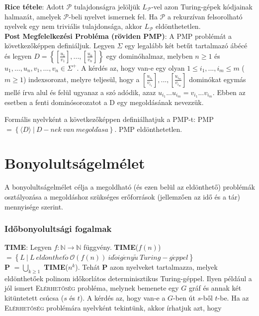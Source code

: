 \documentclass[margin=0px]{article}
\begin{document}
\noindent \textbf{Rice tétele}:
Adott $\mathcal{P}$ tulajdonságra jelöljük $L_{\mathcal{P}}$-vel azon Turing-gépek kódjainak halmazát, amelyek
$\mathcal{P}$-beli nyelvet ismernek fel. Ha $\mathcal{P}$ a rekurzívan felsorolható nyelvek egy nem triviális tulajdonsága, akkor
$L_{\mathcal{P}}$ eldönthetetlen.\\

\noindent \textbf{Post Megfelelkezési Probléma (röviden PMP)}: A PMP problémát a következőképpen definiáljuk. Legyen
$\Sigma$ egy legalább két betűt tartalmazó ábécé és legyen $D = \left\{[\frac{u_{1}}{v_{1}}], ..., [\frac{u_{n}}{v_{n}}]\right\}$
egy dominóhalmaz, melyben $n \geq 1$ és $u_{1}, ..., u_{n}, v_{1}, ..., v_{n} \in \Sigma^{+}$. A kérdés az,	hogy van-e egy olyan
$1 \leq i_{1}, ..., i_{m} \leq m$ ($m \geq 1$) indexsorozat, melyre teljesül, hogy a $[\frac{u_{i_{1}}}{v_{i_{1}}}], ..., [\frac{u_{i_{m}}}{v_{i_{m}}}]$ dominókat egymás mellé írva alul és felül ugyanaz a szó adódik, azaz
$u_{i_{1}} ... u_{i_{m}} = v_{i_{1}} ... v_{i_{m}}$. Ebben az esetben a fenti dominósorozatot a D egy megoldásának nevezzük.

Formális nyelvként a következőképpen definiálhatjuk a PMP-t:
PMP $= \left\{ \langle D \rangle \ |\ D-nek \ van \ megold\acute{a}sa \right\}$. PMP eldönthetetlen.

\section{Bonyolultságelmélet}

A bonyolultságelmélet célja a megoldható (és ezen belül az eldönthető) problémák osztályozása a megoldáshoz szükséges
erőforrások (jellemzően az idő és a tár) mennyisége szerint.

\subsubsection{Időbonyolultsági fogalmak}

\noindent \textbf{TIME}: Legyen $f : \mathbb{N} \to \mathbb{N}$ függvény. \textbf{TIME}($f(n)$) $= \left\{L \ | \ L \ eld\ddot{o}nthet\tilde{o} \ \mathcal{O}(f(n)) \ id\tilde{o}ig\acute{e}ny\tilde{u} \ Turing-g\acute{e}ppel \right\}$\\

\noindent \textbf{P} $=\bigcup_{k \geq 1}$ \textbf{TIME}($n^{k}$). Tehát \textbf{P} azon nyelveket tartalmazza,
melyek eldönthetőek polinom időkorlátos	determinisztikus Turing-géppel. Ilyen például a jól ismert \textsc{Elérhetőség}
probléma, melynek bemenete egy $G$ gráf és annak két kitüntetett csúcsa ($s$ és $t$). A	kérdés az, hogy van-e a $G$-ben
út $s$-ből $t$-be. Ha az \textsc{Elérhetőség} problémára nyelvként tekintünk, akkor írhatjuk azt, hogy\\
\end{document}
